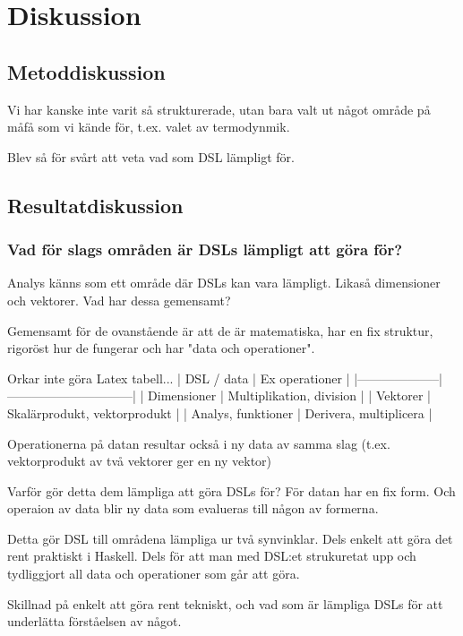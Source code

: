 
\chapter{Diskussion}

\section{Metoddiskussion}

Vi har kanske inte varit så strukturerade, utan bara valt ut något område på måfå som vi kände för, t.ex. valet av termodynmik.

Blev så för svårt att veta vad som DSL lämpligt för.

\section{Resultatdiskussion}

\subsection{Vad för slags områden är DSLs lämpligt att göra för?}

Analys känns som ett område där DSLs kan vara lämpligt. Likaså dimensioner och vektorer. Vad har dessa gemensamt?

Gemensamt för de ovanstående är att de är matematiska, har en fix struktur, rigoröst hur de fungerar och har "data och operationer".

Orkar inte göra Latex tabell...
| DSL / data         | Ex operationer               |
|--------------------|------------------------------|
| Dimensioner        | Multiplikation, division     |
| Vektorer           | Skalärprodukt, vektorprodukt |
| Analys, funktioner | Derivera, multiplicera       |

Operationerna på datan resultar också i ny data av samma slag (t.ex. vektorprodukt av två vektorer ger en ny vektor)

Varför gör detta dem lämpliga att göra DSLs för? För datan har en fix form. Och operaion av data blir ny data som evalueras till någon av formerna.

Detta gör DSL till områdena lämpliga ur två synvinklar. Dels enkelt att göra det rent praktiskt i Haskell. Dels för att man med DSL:et strukuretat upp och tydliggjort all data och operationer som går att göra.

Skillnad på enkelt att göra rent tekniskt, och vad som är lämpliga DSLs för att underlätta förståelsen av något.

